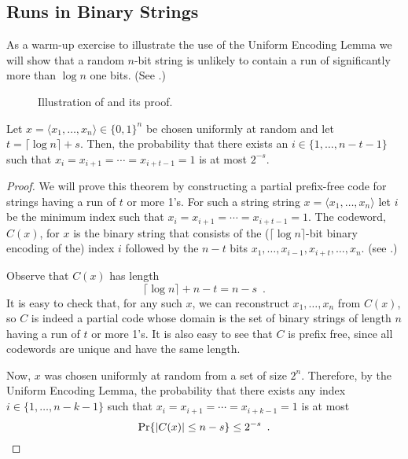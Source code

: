 \documentclass{patmorin}
\begin{document}
\subsection{Runs in Binary Strings}

As a warm-up exercise to illustrate the use of the Uniform Encoding
Lemma we will show that a random $n$-bit string is unlikely to contain
a run of significantly more than $\log n$ one bits.  (See .)

\begin{figure}
  \caption{Illustration of  and its proof.}
\end{figure}

\begin{thm}
  Let $x=\langle x_1,\ldots,x_n\rangle\in\{0,1\}^n$ be chosen
  uniformly at random and let $t=\lceil\log n\rceil + s$. Then, the
  probability that there exists an $i\in\{1,\ldots,n-t-1\}$ such that
  $x_i=x_{i+1}=\cdots=x_{i+t-1}=1$ is at most $2^{-s}$.
\end{thm}

\begin{proof}
  We will prove this theorem by constructing a partial prefix-free
  code for strings having a run of $t$ or more 1's.  For such a string
  string $x=\langle x_1,\ldots,x_n\rangle$ let $i$ be the minimum index
  such that $x_i=x_{i+1}=\cdots=x_{i+t-1}=1$. The codeword, $C(x)$,
  for $x$ is the binary string that consists of the ($\lceil\log
   n\rceil$-bit binary encoding of the) index $i$ followed by the $n-t$
  bits $x_1,\ldots,x_{i-1},x_{i+t},\ldots,x_n$. (see .)

  Observe that $C(x)$ has length 
  \[
      \lceil\log n\rceil + n - t = n-s \enspace .
  \]
  It is easy to check that, for any such $x$, we can reconstruct
  $x_1,\ldots,x_n$ from $C(x)$, so $C$ is indeed a partial code whose
  domain is the set of binary strings of length $n$ having a run of $t$
  or more 1's.  It is also easy to see that $C$ is prefix free, since
  all codewords are unique and have the same length.

  Now, $x$ was chosen uniformly at random from a set of size $2^{n}$.
  Therefore, by the Uniform Encoding Lemma, the probability
  that there exists any index $i\in\{1,\ldots,n-k-1\}$ such that
  $x_i=x_{i+1}=\cdots=x_{i+k-1}=1$ is at most
  \[
      \Pr\{|C(x)|\le n-s\} \le 2^{-s} \enspace . \qedhere 
  \]
\end{proof}
\end{document}
